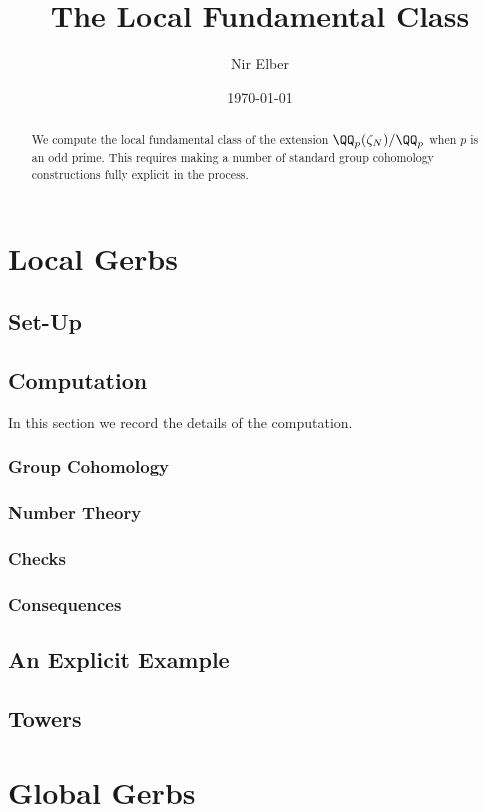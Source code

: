\documentclass{article}
\title{The Local Fundamental Class}
\author{Nir Elber}
\date{\today}
\begin{document}
\maketitle

\begin{abstract}
	\noindent We compute the local fundamental class of the extension $\QQ_p(\zeta_N)/\QQ_p$ when $p$ is an odd prime. This requires making a number of standard group cohomology constructions fully explicit in the process.
\end{abstract}

\setcounter{tocdepth}{4}
\tableofcontents

\section{Local Gerbs}
\subsection{Set-Up} \label{sec:setup}


\subsection{Computation}
In this section we record the details of the computation.

\subsubsection{Group Cohomology}


\subsubsection{Number Theory}


\subsubsection{Checks}


\subsubsection{Consequences}


\subsection{An Explicit Example}


\subsection{Towers}


\section{Global Gerbs}


\printbibliography[heading=bibintoc,title={References}]
\end{document}
